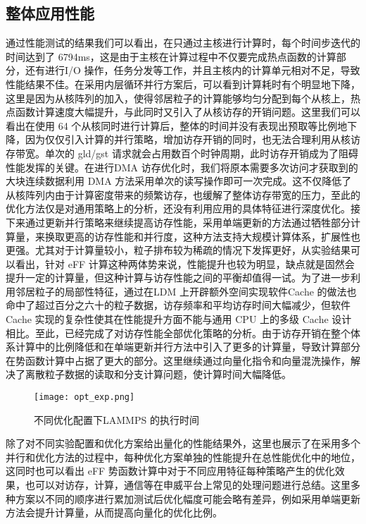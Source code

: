 \subsection{整体应用性能}
 通过性能测试的结果我们可以看出，在只通过主核进行计算时，每个时间步迭代的时间达到了 6794ms，这是由于主核在计算过程中不仅要完成热点函数的计算部分，还有进行I/O 操作，任务分发等工作，并且主核内的计算单元相对不足，导致性能结果不佳。在采用内层循环并行方案后，可以看到计算耗时有个明显地下降，这里是因为从核阵列的加入，使得邻居粒子的计算能够均匀分配到每个从核上，热点函数计算速度大幅提升，与此同时又引入了从核访存的开销问题。这里我们可以看出在使用 64 个从核同时进行计算后，整体的时间并没有表现出预取等比例地下降，因为仅仅引入计算的并行策略，增加访存开销的同时，也无法合理利用从核访存带宽。单次的 gld/gst 请求就会占用数百个时钟周期，此时访存开销成为了阻碍性能发挥的关键。在进行DMA 访存优化时，我们将原本需要多次访问才获取到的大块连续数据利用 DMA 方法采用单次的读写操作即可一次完成。这不仅降低了从核阵列内由于计算密度带来的频繁访存，也缓解了整体访存带宽的压力，至此的优化方法仅是对通用策略上的分析，还没有利用应用的具体特征进行深度优化。接下来通过更新并行策略来继续提高访存性能，采用单端更新的方法通过牺牲部分计算量，来换取更高的访存性能和并行度，这种方法支持大规模计算体系，扩展性也更强。尤其对于计算量较小，粒子排布较为稀疏的情况下发挥更好，从实验结果可以看出，针对 eFF 计算这种两体势来说，性能提升也较为明显，缺点就是固然会提升一定的计算量，但这种计算与访存性能之间的平衡却值得一试。为了进一步利用邻居粒子的局部性特征，通过在LDM 上开辟额外空间实现软件Cache 的做法也命中了超过百分之六十的粒子数据，访存频率和平均访存时间大幅减少，但软件Cache 实现的复杂性使其在性能提升方面不能与通用 CPU 上的多级 Cache 设计相比。至此，已经完成了对访存性能全部优化策略的分析。由于访存开销在整个体系计算中的比例降低和在单端更新并行方法中引入了更多的计算量，导致计算部分在势函数计算中占据了更大的部分。这里继续通过向量化指令和向量混洗操作，解决了离散粒子数据的读取和分支计算问题，使计算时间大幅降低。
 
 \begin{figure}[h]
  \centering
  \texttt{[image: opt\_exp.png]}
  \caption{不同优化配置下LAMMPS 的执行时间}
 \end{figure}
 
除了对不同实验配置和优化方案给出量化的性能结果外，这里也展示了在采用多个并行和优化方法的过程中，每种优化方案单独的性能提升在总性能优化中的地位，这同时也可以看出 eFF 势函数计算中对于不同应用特征每种策略产生的优化效果，也可以对访存，计算，通信等在申威平台上常见的处理问题进行总结。这里多种方案以不同的顺序进行累加测试后优化幅度可能会略有差异，例如采用单端更新方法会提升计算量，从而提高向量化的优化比例。

